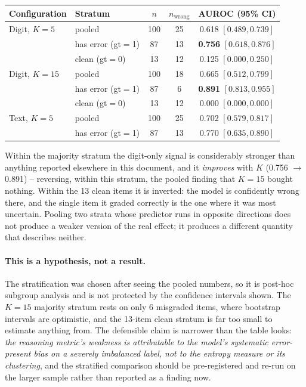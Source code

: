\documentclass[11pt]{article}
\begin{document}
\begin{center}
\begin{tabular}{llccc}
\toprule
Configuration & Stratum & $n$ & $n_{\text{wrong}}$ & AUROC (95\% CI) \\
\midrule
Digit, $K=5$  & pooled              & 100 & 25 & 0.618 $[0.489, 0.739]$ \\
              & has error (gt$=$1)  & 87  & 13 & \textbf{0.756} $[0.618, 0.876]$ \\
              & clean (gt$=$0)      & 13  & 12 & 0.125 $[0.000, 0.250]$ \\
\midrule
Digit, $K=15$ & pooled              & 100 & 18 & 0.665 $[0.512, 0.799]$ \\
              & has error (gt$=$1)  & 87  & 6  & \textbf{0.891} $[0.813, 0.955]$ \\
              & clean (gt$=$0)      & 13  & 12 & 0.000 $[0.000, 0.000]$ \\
\midrule
Text, $K=5$   & pooled              & 100 & 25 & 0.702 $[0.579, 0.817]$ \\
              & has error (gt$=$1)  & 87  & 13 & 0.770 $[0.635, 0.890]$ \\
\bottomrule
\end{tabular}
\end{center}

Within the majority stratum the digit-only signal is considerably stronger than
anything reported elsewhere in this document, and it \emph{improves} with $K$
(0.756 $\rightarrow$ 0.891) -- reversing, within this stratum, the pooled
finding that $K=15$ bought nothing. Within the 13 clean items it is inverted:
the model is confidently wrong there, and the single item it graded correctly
is the one where it was most uncertain. Pooling two strata whose predictor runs
in opposite directions does not produce a weaker version of the real effect; it
produces a different quantity that describes neither.

\paragraph{This is a hypothesis, not a result.} The stratification was chosen
after seeing the pooled numbers, so it is post-hoc subgroup analysis and is not
protected by the confidence intervals shown. The $K=15$ majority stratum rests
on only 6 misgraded items, where bootstrap intervals are optimistic, and the
13-item clean stratum is far too small to estimate anything from. The
defensible claim is narrower than the table looks: \emph{the reasoning metric's
weakness is attributable to the model's systematic error-present bias on a
severely imbalanced label, not to the entropy measure or its clustering}, and
the stratified comparison should be pre-registered and re-run on the larger
sample rather than reported as a finding now.
\end{document}
